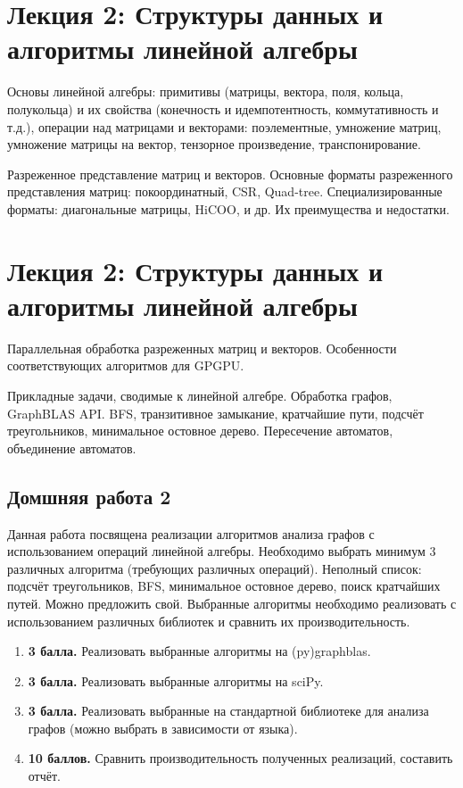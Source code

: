 \section{Лекция 2: Структуры данных и алгоритмы линейной алгебры}


Основы линейной алгебры: примитивы (матрицы,  вектора, поля, кольца, полукольца) и их свойства (конечность и идемпотентность, коммутативность и т.д.), операции над матрицами и векторами: поэлементные, умножение матриц, умножение матрицы на вектор, тензорное произведение, транспонирование.


Разреженное представление матриц и векторов. Основные форматы разреженного представления матриц: покоординатный, CSR, Quad-tree. Специализированные форматы: диагональные матрицы, HiCOO, и др. Их преимущества и недостатки.

\section{Лекция 2: Структуры данных и алгоритмы линейной алгебры}

Параллельная обработка разреженных матриц и векторов. Особенности соответствующих алгоритмов для GPGPU.

Прикладные задачи, сводимые к линейной алгебре. Обработка графов, GraphBLAS API. BFS, транзитивное замыкание, кратчайшие пути, подсчёт треугольников, минимальное остовное дерево. Пересечение автоматов, объединение автоматов.


\subsection{Домшняя работа 2}

Данная работа посвящена реализации алгоритмов анализа графов с использованием операций линейной алгебры. Необходимо выбрать минимум 3 различных алгоритма (требующих различных операций). Неполный список: подсчёт треугольников, BFS, минимальное остовное дерево, поиск кратчайших путей. Можно предложить свой. Выбранные алгоритмы необходимо реализовать с использованием различных библиотек и сравнить их производительность.

\begin{enumerate}
   \item \textbf{3 балла.} Реализовать выбранные алгоритмы на (py)graphblas.
   \item \textbf{3 балла.} Реализовать выбранные алгоритмы на sciPy.
   \item \textbf{3 балла.} Реализовать выбранные на стандартной библиотеке для анализа графов (можно выбрать в зависимости от языка).
   \item \textbf{10 баллов.} Сравнить производительность полученных реализаций, составить отчёт.
\end{enumerate}


